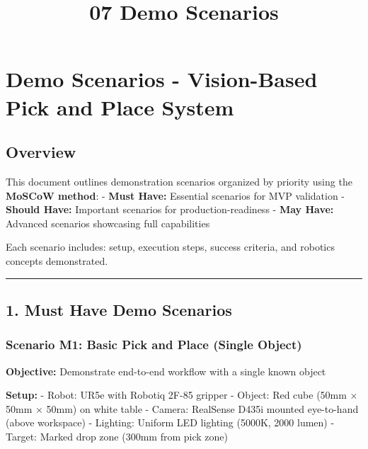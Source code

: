 \documentclass[
]{article}
\title{07 Demo Scenarios}
\author{}
\date{}
\begin{document}
\maketitle

{
\setcounter{tocdepth}{3}
\tableofcontents
}
\hypertarget{demo-scenarios---vision-based-pick-and-place-system}{%
\section{Demo Scenarios - Vision-Based Pick and Place
System}\label{demo-scenarios---vision-based-pick-and-place-system}}

\hypertarget{overview}{%
\subsection{Overview}\label{overview}}

This document outlines demonstration scenarios organized by priority
using the \textbf{MoSCoW method}: - \textbf{Must Have:} Essential
scenarios for MVP validation - \textbf{Should Have:} Important scenarios
for production-readiness - \textbf{May Have:} Advanced scenarios
showcasing full capabilities

Each scenario includes: setup, execution steps, success criteria, and
robotics concepts demonstrated.

\begin{center}\rule{0.5\linewidth}{0.5pt}\end{center}

\hypertarget{must-have-demo-scenarios}{%
\subsection{1. Must Have Demo
Scenarios}\label{must-have-demo-scenarios}}

\hypertarget{scenario-m1-basic-pick-and-place-single-object}{%
\subsubsection{Scenario M1: Basic Pick and Place (Single
Object)}\label{scenario-m1-basic-pick-and-place-single-object}}

\textbf{Objective:} Demonstrate end-to-end workflow with a single known
object

\textbf{Setup:} - Robot: UR5e with Robotiq 2F-85 gripper - Object: Red
cube (50mm × 50mm × 50mm) on white table - Camera: RealSense D435i
mounted eye-to-hand (above workspace) - Lighting: Uniform LED lighting
(5000K, 2000 lumen) - Target: Marked drop zone (300mm from pick zone)
\end{document}

